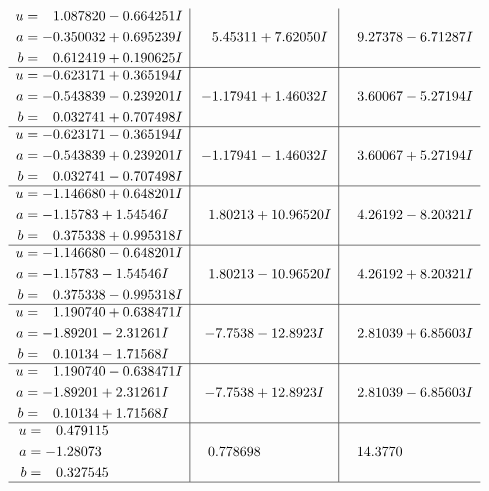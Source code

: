 \documentclass[1p]{elsarticle_modified}
\theoremstyle{definition}
\begin{document}
$$\begin{array}{c|c|c}
\begin{aligned}
u &= \phantom{-}1.087820 - 0.664251 I \\
a &= -0.350032 + 0.695239 I \\
b &= \phantom{-}0.612419 + 0.190625 I\end{aligned}
 & \phantom{-}5.45311 + 7.62050 I & \phantom{-}9.27378 - 6.71287 I \\ \hline\begin{aligned}
u &= -0.623171 + 0.365194 I \\
a &= -0.543839 - 0.239201 I \\
b &= \phantom{-}0.032741 + 0.707498 I\end{aligned}
 & -1.17941 + 1.46032 I & \phantom{-}3.60067 - 5.27194 I \\ \hline\begin{aligned}
u &= -0.623171 - 0.365194 I \\
a &= -0.543839 + 0.239201 I \\
b &= \phantom{-}0.032741 - 0.707498 I\end{aligned}
 & -1.17941 - 1.46032 I & \phantom{-}3.60067 + 5.27194 I \\ \hline\begin{aligned}
u &= -1.146680 + 0.648201 I \\
a &= -1.15783 + 1.54546 I \\
b &= \phantom{-}0.375338 + 0.995318 I\end{aligned}
 & \phantom{-}1.80213 + 10.96520 I & \phantom{-}4.26192 - 8.20321 I \\ \hline\begin{aligned}
u &= -1.146680 - 0.648201 I \\
a &= -1.15783 - 1.54546 I \\
b &= \phantom{-}0.375338 - 0.995318 I\end{aligned}
 & \phantom{-}1.80213 - 10.96520 I & \phantom{-}4.26192 + 8.20321 I \\ \hline\begin{aligned}
u &= \phantom{-}1.190740 + 0.638471 I \\
a &= -1.89201 - 2.31261 I \\
b &= \phantom{-}0.10134 - 1.71568 I\end{aligned}
 & -7.7538 - 12.8923 I & \phantom{-}2.81039 + 6.85603 I \\ \hline\begin{aligned}
u &= \phantom{-}1.190740 - 0.638471 I \\
a &= -1.89201 + 2.31261 I \\
b &= \phantom{-}0.10134 + 1.71568 I\end{aligned}
 & -7.7538 + 12.8923 I & \phantom{-}2.81039 - 6.85603 I \\ \hline\begin{aligned}
u &= \phantom{-}0.479115\phantom{ +0.000000I} \\
a &= -1.28073\phantom{ +0.000000I} \\
b &= \phantom{-}0.327545\phantom{ +0.000000I}\end{aligned}
 & \phantom{-}0.778698\phantom{ +0.000000I} & \phantom{-}14.3770\phantom{ +0.000000I}\\
 \hline 
 \end{array}$$\newpage\newpage\renewcommand{\arraystretch}{1}
\end{document}
